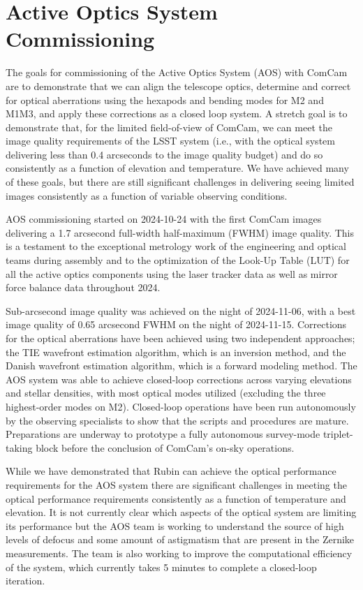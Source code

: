 \section{Active Optics System Commissioning}
\label{sec:aos_commissioning}

The goals for commissioning of the Active Optics System (AOS) with ComCam are to demonstrate that we can align the telescope optics, determine and correct for optical aberrations using the hexapods and bending modes for M2 and M1M3, and apply these corrections as a closed loop system. A stretch goal is to demonstrate that, for the limited field-of-view of ComCam, we can meet the image quality requirements of the LSST system (i.e., with the optical system delivering less than 0.4 arcseconds to the image quality budget) and do so consistently as a function of elevation and temperature. We have achieved many of these goals, but there are still significant challenges in delivering seeing limited images consistently as a function of variable observing conditions.

AOS commissioning started on 2024-10-24 with the first ComCam images delivering a 1.7 arcsecond full-width half-maximum (FWHM) image quality. This is a testament to the exceptional metrology work of the engineering and optical teams during assembly and to the optimization of the Look-Up Table (LUT) for all the active optics components using the  laser tracker data as well as mirror force balance data throughout 2024. 

Sub-arcsecond image quality was achieved on the night of 2024-11-06, with a best image quality of 0.65 arcsecond FWHM on the night of 2024-11-15. Corrections for the optical aberrations have been achieved using two independent approaches; the TIE wavefront estimation algorithm, which is an inversion method, and the Danish wavefront estimation algorithm, which is a forward modeling method. The AOS system was able to achieve closed-loop corrections across varying elevations and stellar densities, with most optical modes utilized (excluding the three highest-order modes on M2). Closed-loop operations have been run autonomously by the observing specialists to show that the scripts and procedures are mature. Preparations are underway to prototype a fully autonomous survey-mode triplet-taking block before the conclusion of ComCam's on-sky operations.

While we have demonstrated that Rubin can achieve the optical performance requirements for the AOS system there are significant challenges in meeting the optical performance requirements consistently as a function of temperature and elevation. It is not currently clear which aspects of the optical system are limiting its performance but the AOS team is working to understand the source of high levels of defocus and some amount of astigmatism that are present in the Zernike measurements. The team is also working to improve the computational efficiency of the system, which currently takes 5 minutes to complete a closed-loop iteration. 

